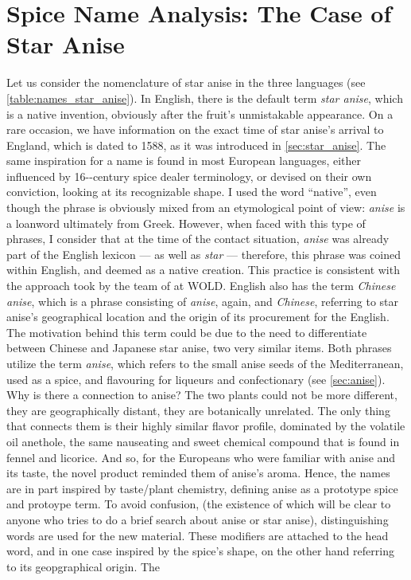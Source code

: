 




\section{Spice Name Analysis: The Case of Star Anise}
\label{sec:case_star_anise}

Let us consider the nomenclature of star anise in the three languages (see \cref{table:names_star_anise}). In English, there is the default term \textit{star anise}, which is a native invention, obviously after the fruit's unmistakable appearance. On a rare occasion, we have information on the exact time of star anise's arrival to England, which is dated to 1588, as it was introduced in \cref{sec:star_anise}. The same inspiration for a name is found in most European languages, either influenced by 16--century spice dealer terminology, or devised on their own conviction, looking at its recognizable shape. I used the word ``native'', even though the phrase is obviously mixed from an etymological point of view: \textit{anise} is a loanword ultimately from Greek. However, when faced with this type of phrases, I consider that at the time of the contact situation, \textit{anise} was already part of the English lexicon --- as well as \textit{star} --- therefore, this phrase was coined within English, and deemed as a native creation. This practice is consistent with the approach took by the team of \textcite{wold} at \gls{WOLD}. English also has the term \textit{Chinese anise}, which is a phrase consisting of \textit{anise}, again, and \textit{Chinese}, referring to star anise's geographical location and the origin of its procurement for the English. The motivation behind this term could be due to the need to differentiate between Chinese and Japanese star anise, two very similar items. Both phrases utilize the term \textit{anise}, which refers to the small anise seeds of the Mediterranean, used as a spice, and flavouring for liqueurs and confectionary (see \cref{sec:anise}). Why is there a connection to anise? The two plants could not be more different, they are geographically distant, they are botanically unrelated. The only thing that connects them is their highly similar flavor profile, dominated by the volatile oil anethole, the same nauseating and sweet chemical compound that is found in fennel and licorice. And so, for the Europeans who were familiar with anise and its taste, the novel product reminded them of anise's aroma. Hence, the names are in part inspired by taste/plant chemistry, defining anise as a prototype spice and protoype term. To avoid confusion, (the existence of which will be clear to anyone who tries to do a brief search about anise or star anise), distinguishing words are used for the new material. These modifiers are attached to the head word, and in one case inspired by the spice's shape, on the other hand referring to its geopgraphical origin. The 